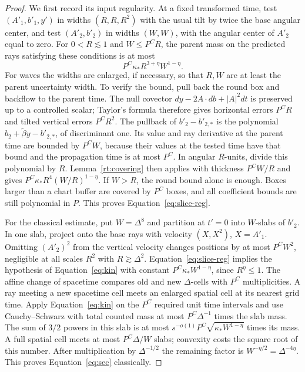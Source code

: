 \begin{proof}
We first record its input regularity.  At a fixed transformed time,
test $(A'_1,b'_1,y')$ in widths $(R,R,R^2)$ with the usual tilt by
twice the base angular center, and test $(A'_2,b'_2)$ in widths
$(W,W)$, with the angular center of $A'_2$ equal to zero.  For
$0<R\lesssim1$ and $W\le P^C R$, the parent mass on the predicted
rays satisfying these conditions is at most
\begin{equation}
 P^C\kappa_* R^{3+\eta}W^{1-\eta}.
 \tag{slice-reg}\label{eq:slice-reg}
\end{equation}
For waves the widths are enlarged, if necessary, so that $R,W$ are
at least the parent uncertainty width.  To verify the bound, pull
back the round box and backflow to the parent time.  The null
covector
$dy-2A\cdot db+|A|^2dt$ is preserved up to a controlled scalar;
Taylor's formula therefore gives horizontal errors $P^C R$ and
tilted vertical errors $P^C R^2$.  The pullback of
$b'_2-b'_{2,*}$ is the polynomial
$b_2+\widetilde\beta y-b'_{2,*}$, of discriminant one.
Its value and ray derivative at the parent time are bounded by
$P^C W$, because their values at the tested time have that bound
and the propagation time is at most $P^C$.  In angular $R$-units,
divide this polynomial by $R$.  Lemma~\ref{rt:covering} then
applies with thickness $P^C W/R$ and gives
$P^C\kappa_*R^4(W/R)^{1-\eta}$.  If $W>R$, the round bound
alone is enough.  Boxes larger than a chart buffer are covered by
$P^C$ boxes, and all coefficient bounds are still polynomial in $P$.
This proves Equation~\eqref{eq:slice-reg}.

For the classical estimate, put $W=\Delta^8$ and partition at
$t'=0$ into $W$-slabs of $b'_2$.  In one slab, project onto the base
rays with velocity $(X,X^2)$, $X=A'_1$.  Omitting $(A'_2)^2$
from the vertical velocity changes positions by at most
$P^C W^2$, negligible at all scales $R^2$ with
$R\gtrsim\Delta^2$.  Equation~\eqref{eq:slice-reg} implies the
hypothesis of Equation~\eqref{eq:kin} with constant
$P^C\kappa_*W^{1-\eta}$, since $R^\eta\le1$.
The affine change of spacetime compares old and new
$\Delta$-cells with $P^C$ multiplicities.  A ray meeting a new
spacetime cell meets an enlarged spatial cell at its nearest grid
time.  Apply Equation~\eqref{eq:kin} on the $P^C$ required unit time
intervals and use Cauchy--Schwarz with total counted mass at most
$P^C\Delta^{-1}$ times the slab mass.  The sum of $3/2$ powers in
this slab is at most
$s^{-o(1)}P^C\sqrt{\kappa_*W^{1-\eta}}$ times its mass.
A full spatial cell meets at most $P^C\Delta/W$ slabs; convexity
costs the square root of this number.  After multiplication by
$\Delta^{-1/2}$ the remaining factor is
$W^{-\eta/2}=\Delta^{-4\eta}$.  This proves
Equation~\eqref{eq:sec} classically.


\end{proof}
